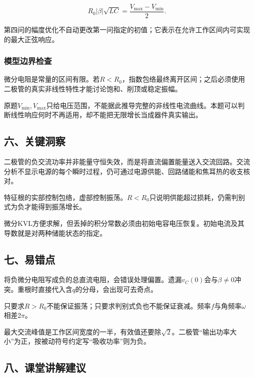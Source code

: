 \documentclass[12pt,a4paper,fontset=fandol]{ctexart}
\begin{document}
\[
R_0|\beta|\sqrt{LC}
=\frac{V_{\max}-V_{\min}}2.
\]

第四问的幅度优化不自动更改第一问指定的初值；它表示在允许工作区间内可实现的最大正弦响应。

\subsubsection{模型边界检查}\label{ux6a21ux578bux8fb9ux754cux68c0ux67e5}

微分电阻是常量的区间有限。若\(R<R_0\)，指数包络最终离开区间；之后必须使用二极管的真实非线性特性才能讨论饱和、削顶或稳定振幅。

原题\(V_{\min},V_{\max}\)只给电压范围，不能据此推导完整的非线性电流曲线。本题可以判断线性响应何时不再适用，却不能把无限增长当成器件真实输出。

\subsection{六、关键洞察}\label{ux516dux5173ux952eux6d1eux5bdf-2}

二极管的负交流功率并非能量守恒失效，而是将直流偏置能量送入交流回路。交流分析不显示电源的每个瞬时过程，仍可通过电源供能、回路储能和焦耳热的收支核对。

特征根的实部控制包络，虚部控制振荡。\(R<R_0\)只说明供能超过损耗，仍需判别式为负才能得到振荡增长。

微分KVL方便求解，但丢掉的积分常数必须由初始电容电压恢复。初始电流及其导数就是对两种储能状态的指定。

\subsection{七、易错点}\label{ux4e03ux6613ux9519ux70b9-2}

将负微分电阻写成负的总直流电阻，会错误处理偏置。遗漏\(v_C(0)\)会与\(\beta\neq0\)冲突。重根时直接代入含\(q\)的分母，会出现可去奇点。

只要求\(R>R_0\)不能保证振荡；只要求判别式负也不能保证衰减。频率\(f\)与角频率\(\omega\)相差\(2\pi\)。

最大交流峰值是工作区间宽度的一半，有效值还要除\(\sqrt2\)。二极管``输出功率大小''为正，按被动符号约定写``吸收功率''则为负。

\subsection{八、课堂讲解建议}\label{ux516bux8bfeux5802ux8bb2ux89e3ux5efaux8bae-2}
\end{document}
